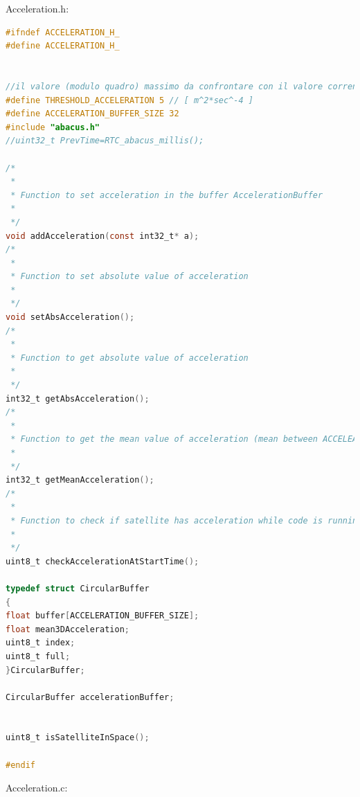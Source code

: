 \documentclass[LaM,binding=0.6cm]{../sapthesis}
\begin{document}
Acceleration.h:
\begin{small}
\begin{lstlisting}[language=C]
#ifndef ACCELERATION_H_
#define ACCELERATION_H_


//il valore (modulo quadro) massimo da confrontare con il valore corrente di accelerazione (servirÃ  un valore molto piÃ¹ basso)
#define THRESHOLD_ACCELERATION 5 // [ m^2*sec^-4 ]
#define ACCELERATION_BUFFER_SIZE 32
#include "abacus.h"
//uint32_t PrevTime=RTC_abacus_millis();

/*
 *
 * Function to set acceleration in the buffer AccelerationBuffer
 *
 */
void addAcceleration(const int32_t* a);
/*
 *
 * Function to set absolute value of acceleration 
 *
 */
void setAbsAcceleration();
/*
 *
 * Function to get absolute value of acceleration
 *
 */
int32_t getAbsAcceleration();
/*
 *
 * Function to get the mean value of acceleration (mean between ACCELEARTION_BUFFER_SIZE amount of samples)
 *
 */
int32_t getMeanAcceleration();
/*
 *
 * Function to check if satellite has acceleration while code is running. This should check only one time acceleration and stop all the operations if needed for N seconds
 *
 */
uint8_t checkAccelerationAtStartTime();

typedef struct CircularBuffer
{
float buffer[ACCELERATION_BUFFER_SIZE];
float mean3DAcceleration;
uint8_t index;
uint8_t full;
}CircularBuffer;

CircularBuffer accelerationBuffer;


uint8_t isSatelliteInSpace();

#endif
\end{lstlisting}
\end{small}
Acceleration.c:
\end{document}
